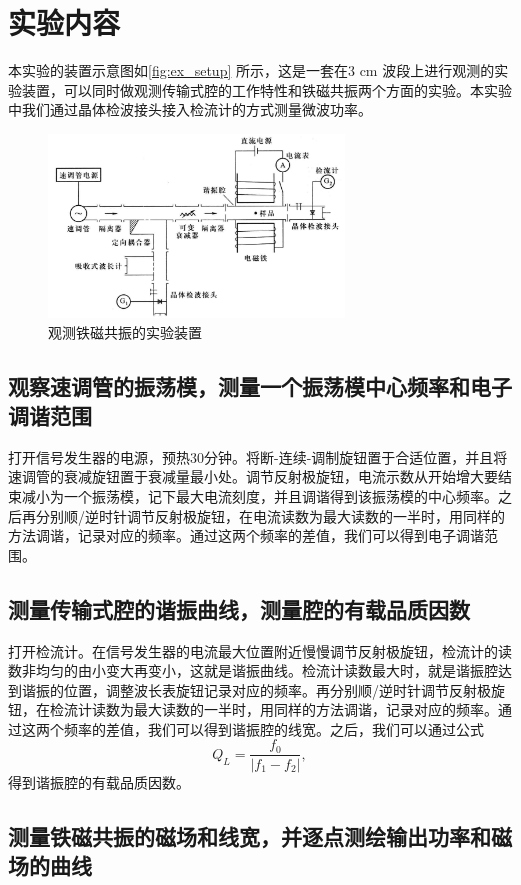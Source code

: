 \documentclass[font=default]{mpltx}
\begin{document}
\section{实验内容}
本实验的装置示意图如\autoref{fig:ex_setup} 所示，这是一套在3 cm 波段上进行观测的实验装置，可以同时做观测传输式腔的工作特性和铁磁共振两个方面的实验。本实验中我们通过晶体检波接头接入检流计的方式测量微波功率。
\begin{figure}
  \centering
  \includegraphics[width=0.7\textwidth]{fig/ex_setup.png}
  \caption{观测铁磁共振的实验装置}
  \label{fig:ex_setup}
\end{figure}
\subsection{观察速调管的振荡模，测量一个振荡模中心频率和电子调谐范围}
打开信号发生器的电源，预热30分钟。将断-连续-调制旋钮置于合适位置，并且将速调管的衰减旋钮置于衰减量最小处。调节反射极旋钮，电流示数从开始增大要结束减小为一个振荡模，记下最大电流刻度，并且调谐得到该振荡模的中心频率。之后再分别顺/逆时针调节反射极旋钮，在电流读数为最大读数的一半时，用同样的方法调谐，记录对应的频率。通过这两个频率的差值，我们可以得到电子调谐范围。
\subsection{测量传输式腔的谐振曲线，测量腔的有载品质因数}
打开检流计。在信号发生器的电流最大位置附近慢慢调节反射极旋钮，检流计的读数非均匀的由小变大再变小，这就是谐振曲线。检流计读数最大时，就是谐振腔达到谐振的位置，调整波长表旋钮记录对应的频率。再分别顺/逆时针调节反射极旋钮，在检流计读数为最大读数的一半时，用同样的方法调谐，记录对应的频率。通过这两个频率的差值，我们可以得到谐振腔的线宽。之后，我们可以通过公式$$Q_L=\frac{f_0}{|f_1-f_2|},$$得到谐振腔的有载品质因数。

\subsection{测量铁磁共振的磁场和线宽，并逐点测绘输出功率和磁场的曲线}
\end{document}
